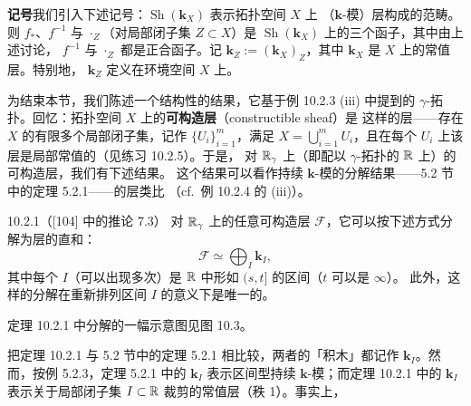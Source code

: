 
\par\medskip\noindent\textbf{记号}\quad 我们引入下述记号：$\operatorname{Sh}(\mathbf{k}_X)$ 表示拓扑空间 $X$ 上
（$\mathbf{k}$-模）层构成的范畴。则 $f_\ast$、$f^{-1}$ 与 $\cdot_Z$（对局部闭子集
$Z\subset X$）是 $\operatorname{Sh}(\mathbf{k}_X)$ 上的三个函子，其中由上述讨论，
$f^{-1}$ 与 $\cdot_Z$ 都是正合函子。记
$\mathbf{k}_Z:=(\mathbf{k}_X)_Z$，其中 $\mathbf{k}_X$ 是 $X$ 上的常值层。特别地，
$\mathbf{k}_Z$ 定义在环境空间 $X$ 上。

为结束本节，我们陈述一个结构性的结果，它基于例 10.2.3 (iii) 中提到的
$\gamma$-拓扑。回忆：拓扑空间 $X$ 上的\textbf{可构造层}（constructible sheaf）是
这样的层——存在 $X$ 的有限多个局部闭子集，记作 $\{U_i\}_{i=1}^m$，满足
$X=\bigcup_{i=1}^m U_i$，且在每个 $U_i$ 上该层是局部常值的（见练习 10.2.5）。于是，
对 $\mathbb{R}_\gamma$ 上（即配以 $\gamma$-拓扑的 $\mathbb{R}$ 上）的可构造层，我们有下述结果。
这个结果可以看作持续 $\mathbf{k}$-模的分解结果——5.2 节中的定理 5.2.1——的层类比
（cf.\ 例 10.2.4 的 (iii)）。

\begin{wthm}{10.2.1（[104] 中的推论 7.3）}
  对 $\mathbb{R}_\gamma$ 上的任意可构造层 $\mathcal{F}$，它可以按下述方式分解为层的直和：
  \[
    \mathcal{F}\simeq\bigoplus_{I}\mathbf{k}_I,
  \]
  其中每个 $I$（可以出现多次）是 $\mathbb{R}$ 中形如 $(s,t]$ 的区间（$t$ 可以是 $\infty$）。
  此外，这样的分解在重新排列区间 $I$ 的意义下是唯一的。
\end{wthm}

定理 10.2.1 中分解的一幅示意图见图 10.3。

把定理 10.2.1 与 5.2 节中的定理 5.2.1 相比较，两者的「积木」都记作
$\mathbf{k}_I$。然而，按例 5.2.3，定理 5.2.1 中的 $\mathbf{k}_I$ 表示区间型持续
$\mathbf{k}$-模；而定理 10.2.1 中的 $\mathbf{k}_I$ 表示关于局部闭子集
$I\subset\mathbb{R}$ 裁剪的常值层（秩 1）。事实上，


